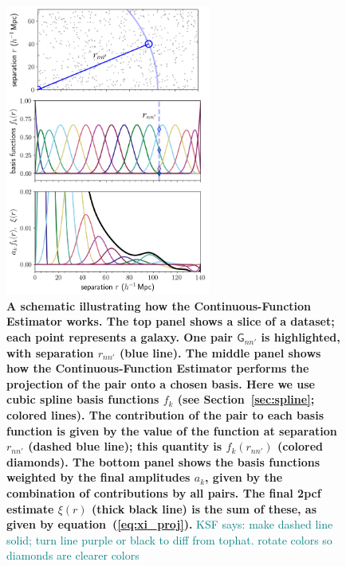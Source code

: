 \documentclass[modern]{aastex62}
\newcommand{\cf}{2pcf\xspace}
\newcommand{\est}{the Continuous-Function Estimator\xspace}
\newcommand{\eqt}[1]{equation~(\ref{#1})}
\newcommand{\GG}[1]{\mathsf{G}_{#1}}
\newcommand{\KSF}[1]{\textcolor{teal}{KSF says: #1}}
\newcommand{\new}[1]{\textbf{#1}}
\begin{document}
\begin{figure}[t!]
    \centering
    \includegraphics[width=0.6\textwidth]{schematic_spline}
    \caption{\new{A schematic illustrating how \est works. The top panel shows a slice of a dataset; each point represents a galaxy. One pair $\GG{n n'}$ is highlighted, with separation $r_{n n'}$ (blue line). The middle panel shows how \est performs the projection of the pair onto a chosen basis. Here we use cubic spline basis functions $f_k$ (see Section~\ref{sec:spline}; colored lines). The contribution of the pair to each basis function is given by the value of the function at separation $r_{n n'}$ (dashed blue line); this quantity is $f_k(r_{n n'})$ (colored diamonds). The bottom panel shows the basis functions weighted by the final amplitudes $a_k$, given by the combination of contributions by all pairs. The final \cf estimate $\xi(r)$ (thick black line) is the sum of these, as given by \eqt{eq:xi_proj}.} \KSF{make dashed line solid; turn line purple or black to diff from tophat. rotate colors so diamonds are clearer colors}}
    \label{fig:schematic}
\end{figure}
\end{document}
